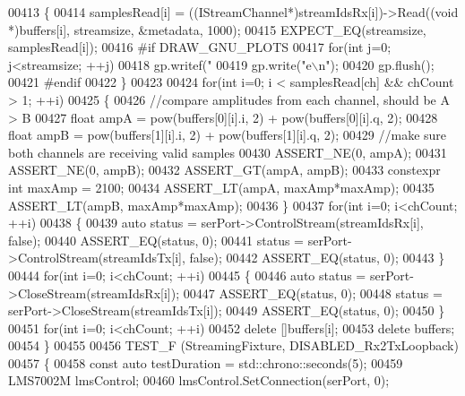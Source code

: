 \begin{DoxyCode}
{{{00413     \{
00414         samplesRead[i] = ((IStreamChannel*)streamIdsRx[i])->Read((\textcolor{keywordtype}{void} *)buffers[i], streamsize, &metadata,
       1000);
00415         EXPECT\_EQ(streamsize, samplesRead[i]);
00416 \textcolor{preprocessor}{#if DRAW\_GNU\_PLOTS}
00417         \textcolor{keywordflow}{for}(\textcolor{keywordtype}{int} j=0; j<streamsize; ++j)
00418             gp.writef(\textcolor{stringliteral}{"%
00419         gp.write(\textcolor{stringliteral}{"e\(\backslash\)n"});
00420         gp.flush();
00421 \textcolor{preprocessor}{#endif}
00422     \}
00423 
00424     \textcolor{keywordflow}{for}(\textcolor{keywordtype}{int} i=0; i < samplesRead[ch] && chCount > 1; ++i)
00425     \{
00426         \textcolor{comment}{//compare amplitudes from each channel, should be A > B}
00427         \textcolor{keywordtype}{float} ampA = pow(buffers[0][i].i, 2) + pow(buffers[0][i].q, 2);
00428         \textcolor{keywordtype}{float} ampB = pow(buffers[1][i].i, 2) + pow(buffers[1][i].q, 2);
00429         \textcolor{comment}{//make sure both channels are receiving valid samples}
00430         ASSERT\_NE(0, ampA);
00431         ASSERT\_NE(0, ampB);
00432         ASSERT\_GT(ampA, ampB);
00433         constexpr \textcolor{keywordtype}{int} maxAmp = 2100;
00434         ASSERT\_LT(ampA, maxAmp*maxAmp);
00435         ASSERT\_LT(ampB, maxAmp*maxAmp);
00436     \}
00437     \textcolor{keywordflow}{for}(\textcolor{keywordtype}{int} i=0; i<chCount; ++i)
00438     \{
00439         \textcolor{keyword}{auto} status = serPort->ControlStream(streamIdsRx[i], \textcolor{keyword}{false});
00440         ASSERT\_EQ(status, 0);
00441         status = serPort->ControlStream(streamIdsTx[i], \textcolor{keyword}{false});
00442         ASSERT\_EQ(status, 0);
00443     \}
00444     \textcolor{keywordflow}{for}(\textcolor{keywordtype}{int} i=0; i<chCount; ++i)
00445     \{
00446         \textcolor{keyword}{auto} status = serPort->CloseStream(streamIdsRx[i]);
00447         ASSERT\_EQ(status, 0);
00448         status = serPort->CloseStream(streamIdsTx[i]);
00449         ASSERT\_EQ(status, 0);
00450     \}
00451     \textcolor{keywordflow}{for}(\textcolor{keywordtype}{int} i=0; i<chCount; ++i)
00452         \textcolor{keyword}{delete} []buffers[i];
00453     \textcolor{keyword}{delete} buffers;
00454 \}
00455 
00456 TEST_F (StreamingFixture, DISABLED\_Rx2TxLoopback)
00457 \{
00458     \textcolor{keyword}{const} \textcolor{keyword}{auto} testDuration = std::chrono::seconds(5);
00459     LMS7002M lmsControl;
00460     lmsControl.SetConnection(serPort, 0);
}}}}
\end{DoxyCode}

